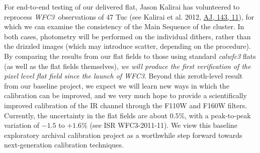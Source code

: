 \documentclass[12pt]{article}
\newcommand{\project}[1]{\textsl{#1}}
\newcommand{\WFC}{\project{WFC3}}
\begin{document}
For end-to-end testing of our delivered flat, Jason
Kalirai has volunteered to reprocess \WFC\ observations of 47 Tuc (see
Kalirai et al. 2012, \href{http://dx.doi.org/10.1088/0004-6256/143/1/11}{AJ, 143, 11}),
for which we can examine the
consistency of the Main Sequence of the cluster.  In both cases,
photometry will be performed on the individual dithers, rather than
the drizzled images (which may introduce scatter, depending on the
procedure).  By comparing the results from our flat fields to those
using standard \emph{calwfc3} flats (as well as the flat fields
themselves), \emph{we will produce the first verification of the pixel
  level flat field since the launch of \WFC}.  Beyond this zeroth-level
result from our baseline project, we expect we will learn new ways in
which the calibration can be improved, and we very much hope to provide a scientifically
improved calibration of the IR channel through the F110W and F160W filters.  Currently, the
uncertainty in the flat fields are about $0.5\%$, with a peak-to-peak
variation of $-1.5$ to $+1.6\%$ (see ISR WFC3-2011-11).  We view this
baseline exploratory archival calibration project as a worthwhile step forward
towards next-generation calibration techniques.
\end{document}
